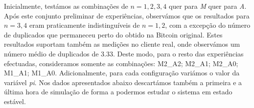 Inicialmente, testámos as combinações de $n={1,2,3,4}$ quer para \textsl{M} quer para \textsl{A}.
Após este conjunto preliminar de experiências, observámos que os resultados para $n={3,4}$ eram praticamente indistinguíveis de $n={1,2}$, com a excepção do número de duplicados que permaneceu perto do obtido na Bitcoin original.
Estes resultados suportam também as medições no cliente real, onde observámos um número médio de duplicados de $3.33$.
Deste modo, para o resto das experiências efectuadas, consideramos somente as combinações:
%
M2\_A2;
M2\_A1;
M2\_A0;
M1\_A1;
M1\_A0.
Adicionalmente, para cada configuração variámos o valor da variável \textsl{pi}.
Nos dados apresentados abaixo descartámos também a primeira e a última hora de simulação de forma a podermos estudar o sistema em estado estável.
\vspace{-0.7cm}

